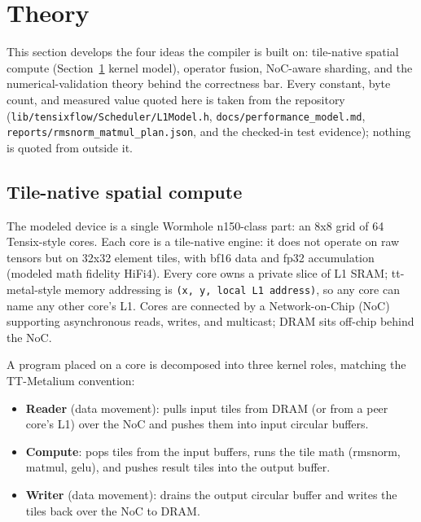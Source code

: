 \section{Theory}\label{sec:theory}

This section develops the four ideas the compiler is built on: tile-native spatial
compute (Section~\ref{sec:theory} kernel model), operator fusion, NoC-aware sharding,
and the numerical-validation theory behind the correctness bar. Every constant, byte
count, and measured value quoted here is taken from the repository
(\texttt{lib/tensixflow/Scheduler/L1Model.h}, \texttt{docs/performance\_model.md},
\texttt{reports/rmsnorm\_matmul\_plan.json}, and the checked-in test evidence);
nothing is quoted from outside it.

\subsection{Tile-native spatial compute}

The modeled device is a single Wormhole n150-class part: an 8x8 grid of 64
Tensix-style cores. Each core is a tile-native engine: it does not operate on raw
tensors but on 32x32 element tiles, with bf16 data and fp32 accumulation (modeled
math fidelity HiFi4). Every core owns a private slice of L1 SRAM; tt-metal-style
memory addressing is \texttt{(x, y, local L1 address)}, so any core can name any
other core's L1. Cores are connected by a Network-on-Chip (NoC) supporting
asynchronous reads, writes, and multicast; DRAM sits off-chip behind the NoC.

A program placed on a core is decomposed into three kernel roles, matching the
TT-Metalium convention:

\begin{itemize}[nosep]
  \item \textbf{Reader} (data movement): pulls input tiles from DRAM (or from a
        peer core's L1) over the NoC and pushes them into input circular buffers.
  \item \textbf{Compute}: pops tiles from the input buffers, runs the tile math
        (rmsnorm, matmul, gelu), and pushes result tiles into the output buffer.
  \item \textbf{Writer} (data movement): drains the output circular buffer and
        writes the tiles back over the NoC to DRAM.
\end{itemize}

